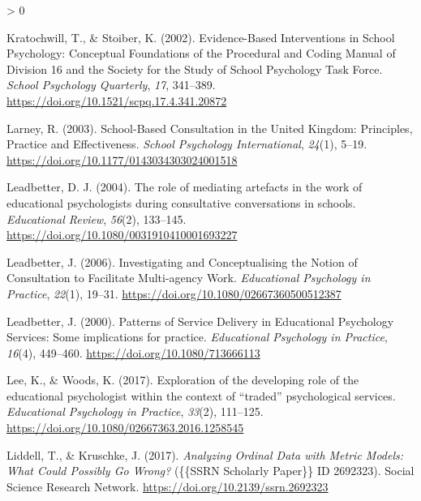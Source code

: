 \documentclass[
  english,
  man]{apa}
\newlength{\cslhangindent}
\newenvironment{CSLReferences}[2] %
 {%
  \setlength{\parindent}{0pt}
  \ifodd #1 \everypar{\setlength{\hangindent}{\cslhangindent}}\ignorespaces\fi
  \ifnum #2 > 0
  \setlength{\parskip}{#2\baselineskip}
  \fi
 }%
 {}
\begin{document}
\begin{CSLReferences}{1}{0}
\leavevmode\hypertarget{ref-kratochwillEvidenceBasedInterventionsSchool2002}{}%
Kratochwill, T., \& Stoiber, K. (2002). Evidence-{Based Interventions} in {School Psychology}: {Conceptual Foundations} of the {Procedural} and {Coding Manual} of {Division} 16 and the {Society} for the {Study} of {School Psychology Task Force}. \emph{School Psychology Quarterly}, \emph{17}, 341--389. \url{https://doi.org/10.1521/scpq.17.4.341.20872}

\leavevmode\hypertarget{ref-larneySchoolBasedConsultationUnited2003}{}%
Larney, R. (2003). School-{Based Consultation} in the {United Kingdom}: {Principles}, {Practice} and {Effectiveness}. \emph{School Psychology International}, \emph{24}(1), 5--19. \url{https://doi.org/10.1177/0143034303024001518}

\leavevmode\hypertarget{ref-leadbetterRoleMediatingArtefacts2004}{}%
Leadbetter, D. J. (2004). The role of mediating artefacts in the work of educational psychologists during consultative conversations in schools. \emph{Educational Review}, \emph{56}(2), 133--145. \url{https://doi.org/10.1080/0031910410001693227}

\leavevmode\hypertarget{ref-leadbetterInvestigatingConceptualisingNotion2006}{}%
Leadbetter, J. (2006). Investigating and {Conceptualising} the {Notion} of {Consultation} to {Facilitate Multi}-agency {Work}. \emph{Educational Psychology in Practice}, \emph{22}(1), 19--31. \url{https://doi.org/10.1080/02667360500512387}

\leavevmode\hypertarget{ref-leadbetterPatternsServiceDelivery2000}{}%
Leadbetter, J. (2000). Patterns of {Service Delivery} in {Educational Psychology Services}: {Some} implications for practice. \emph{Educational Psychology in Practice}, \emph{16}(4), 449--460. \url{https://doi.org/10.1080/713666113}

\leavevmode\hypertarget{ref-leeExplorationDevelopingRole2017}{}%
Lee, K., \& Woods, K. (2017). Exploration of the developing role of the educational psychologist within the context of {``traded''} psychological services. \emph{Educational Psychology in Practice}, \emph{33}(2), 111--125. \url{https://doi.org/10.1080/02667363.2016.1258545}

\leavevmode\hypertarget{ref-liddellAnalyzingOrdinalData2017}{}%
Liddell, T., \& Kruschke, J. (2017). \emph{Analyzing {Ordinal Data} with {Metric Models}: {What Could Possibly Go Wrong}?} (\{\{SSRN Scholarly Paper\}\} ID 2692323). {Social Science Research Network}. \url{https://doi.org/10.2139/ssrn.2692323}


\end{CSLReferences}
\end{document}
